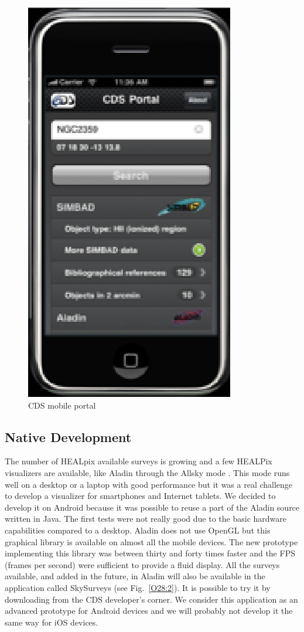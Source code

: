 \begin{figure}[h] \center
\includegraphics[scale=0.7]{part5/Schaaff_O28/O28_f4.eps}
\caption{CDS mobile portal} 
\label{O28:1}
\end{figure}

\subsection{Native Development}
The number of HEALpix \citep{gorski_2005} available surveys is growing and a few HEALPix visualizers are available, like Aladin through the Allsky mode \citep{fernique_2010}. This mode runs well on a desktop or a laptop with good performance but it was a real challenge to develop a visualizer for smartphones and Internet tablets. We decided to develop it on Android because it was possible to reuse a part of the Aladin source written in Java. The first tests were not really good due to the basic hardware capabilities compared to a desktop. Aladin does not use OpenGL but this graphical library is available on almost all the mobile devices. The new prototype implementing this library was between thirty and forty times faster and the FPS (frames per second) were sufficient to provide a fluid display. All the surveys available, and added in the future, in Aladin will also be available in the application called SkySurveys (see Fig.~\ref{O28:2}). It is possible to try it by downloading from the CDS developer's corner. We consider this application as an advanced prototype for Android devices and we will probably not develop it the same way for iOS devices.

